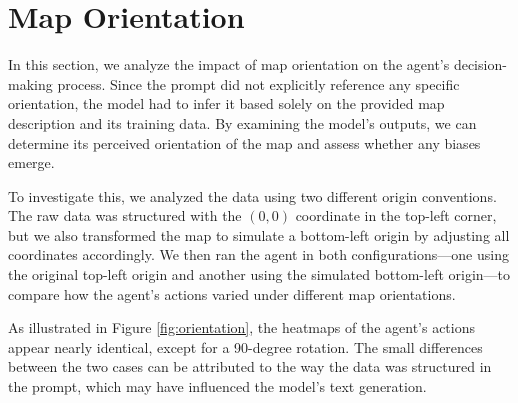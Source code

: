 \section{Map Orientation}

In this section, we analyze the impact of map orientation on the agent's decision-making
process. Since the prompt did not explicitly reference any specific orientation,
the model had to infer it based solely on the provided map description and its training
data. By examining the model's outputs, we can determine its perceived orientation
of the map and assess whether any biases emerge.

To investigate this, we analyzed the data using two different origin conventions.
The raw data was structured with the $(0,0)$ coordinate in the top-left corner,
but we also transformed the map to simulate a bottom-left origin by adjusting
all coordinates accordingly. We then ran the agent in both configurations—one using
the original top-left origin and another using the simulated bottom-left origin—to
compare how the agent's actions varied under different map orientations.

As illustrated in Figure \ref{fig:orientation}, the heatmaps of the agent's
actions appear nearly identical, except for a 90-degree rotation. The small
differences between the two cases can be attributed to the way the data was
structured in the prompt, which may have influenced the model's text generation.

